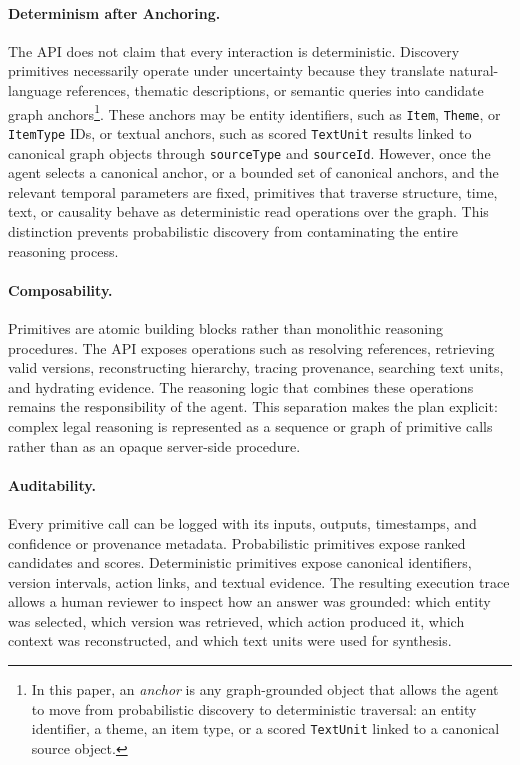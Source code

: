\documentclass[11pt]{article}
\begin{document}
\paragraph{Determinism after Anchoring.}
The API does not claim that every interaction is deterministic. Discovery primitives necessarily operate under uncertainty because they translate natural-language references, thematic descriptions, or semantic queries into candidate graph anchors\footnote{In this paper, an \textit{anchor} is any graph-grounded object that allows the agent to move from probabilistic discovery to deterministic traversal: an entity identifier, a theme, an item type, or a scored \texttt{TextUnit} linked to a canonical source object.}. These anchors may be entity identifiers, such as \texttt{Item}, \texttt{Theme}, or \texttt{ItemType} IDs, or textual anchors, such as scored \texttt{TextUnit} results linked to canonical graph objects through \texttt{sourceType} and \texttt{sourceId}. However, once the agent selects a canonical anchor, or a bounded set of canonical anchors, and the relevant temporal parameters are fixed, primitives that traverse structure, time, text, or causality behave as deterministic read operations over the graph. This distinction prevents probabilistic discovery from contaminating the entire reasoning process.

\paragraph{Composability.}
Primitives are atomic building blocks rather than monolithic reasoning procedures. The API exposes operations such as resolving references, retrieving valid versions, reconstructing hierarchy, tracing provenance, searching text units, and hydrating evidence. The reasoning logic that combines these operations remains the responsibility of the agent. This separation makes the plan explicit: complex legal reasoning is represented as a sequence or graph of primitive calls rather than as an opaque server-side procedure.

\paragraph{Auditability.}
Every primitive call can be logged with its inputs, outputs, timestamps, and confidence or provenance metadata. Probabilistic primitives expose ranked candidates and scores. Deterministic primitives expose canonical identifiers, version intervals, action links, and textual evidence. The resulting execution trace allows a human reviewer to inspect how an answer was grounded: which entity was selected, which version was retrieved, which action produced it, which context was reconstructed, and which text units were used for synthesis.
\end{document}
